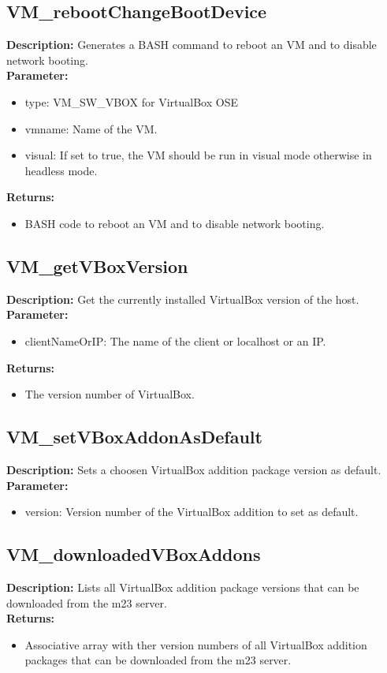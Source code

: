 \subsection{VM\_rebootChangeBootDevice}
\textbf{Description:} Generates a BASH command to reboot an VM and to disable network booting.\\
\textbf{Parameter:}
\begin{itemize}
\item type: VM\_SW\_VBOX for VirtualBox OSE
\item vmname: Name of the VM.
\item visual: If set to true, the VM should be run in visual mode otherwise in headless mode.
\end{itemize}
\textbf{Returns:}
\begin{itemize}
\item BASH code to reboot an VM and to disable network booting.
\end{itemize}

\subsection{VM\_getVBoxVersion}
\textbf{Description:} Get the currently installed VirtualBox version of the host.\\
\textbf{Parameter:}
\begin{itemize}
\item clientNameOrIP: The name of the client or localhost or an IP.
\end{itemize}
\textbf{Returns:}
\begin{itemize}
\item The version number of VirtualBox.
\end{itemize}

\subsection{VM\_setVBoxAddonAsDefault}
\textbf{Description:} Sets a choosen VirtualBox addition package version as default.\\
\textbf{Parameter:}
\begin{itemize}
\item version: Version number of the VirtualBox addition to set as default.
\end{itemize}

\subsection{VM\_downloadedVBoxAddons}
\textbf{Description:} Lists all VirtualBox addition package versions that can be downloaded from the m23 server.\\
\textbf{Returns:}
\begin{itemize}
\item Associative array with ther version numbers of all VirtualBox addition packages that can be downloaded from the m23 server.
\end{itemize}

